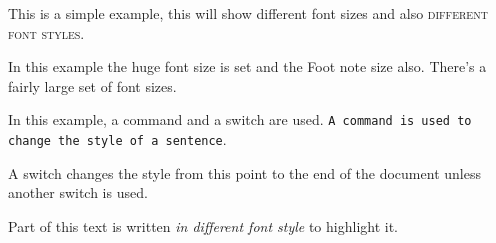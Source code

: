 \documentclass{article}
\begin{document}
This is a simple example, {\tiny this will show different font sizes} and also \textsc{different font styles}. 

\vspace{1cm}

In this example the {\huge huge font size} is set and the {\footnotesize Foot note size also}. There's a fairly large set of font sizes.

\vspace{1cm}

In this example, a command and a switch are used. \texttt{A command is used to change the style of a sentence}.

\sffamily
A switch changes the style from this point to the end of the document unless another switch is used.
\rmfamily

\vspace{1cm}

Part of this text is written \textsl{in different font style} to highlight it.
\end{document}
